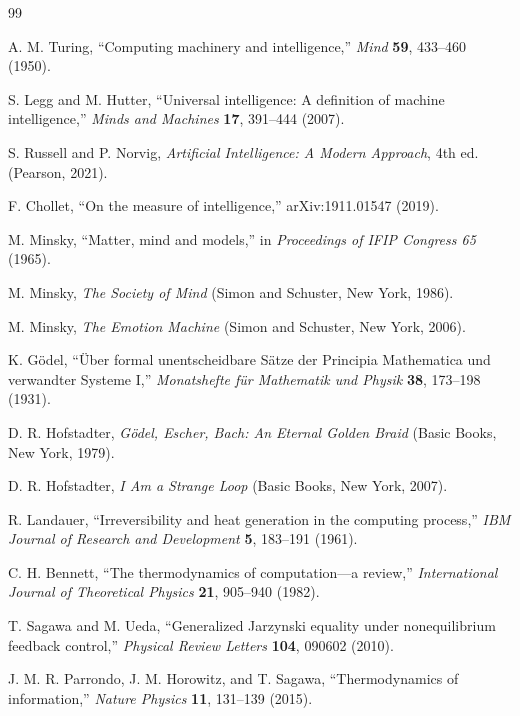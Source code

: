 \documentclass[
  aps,
  prresearch,
  reprint,
  amsmath,
  amssymb,
  superscriptaddress,
  nofootinbib,
  longbibliography
]{revtex4-2}
\begin{document}
\begin{thebibliography}{99}

A. M. Turing, ``Computing machinery and intelligence,'' \emph{Mind} \textbf{59}, 433--460 (1950).

S. Legg and M. Hutter, ``Universal intelligence: A definition of machine intelligence,'' \emph{Minds and Machines} \textbf{17}, 391--444 (2007).

S. Russell and P. Norvig, \emph{Artificial Intelligence: A Modern Approach}, 4th ed. (Pearson, 2021).

F. Chollet, ``On the measure of intelligence,'' arXiv:1911.01547 (2019).

M. Minsky, ``Matter, mind and models,'' in \emph{Proceedings of IFIP Congress 65} (1965).

M. Minsky, \emph{The Society of Mind} (Simon and Schuster, New York, 1986).

M. Minsky, \emph{The Emotion Machine} (Simon and Schuster, New York, 2006).

K. G{\"o}del, ``{\"U}ber formal unentscheidbare S{\"a}tze der Principia Mathematica und verwandter Systeme I,'' \emph{Monatshefte f{\"u}r Mathematik und Physik} \textbf{38}, 173--198 (1931).

D. R. Hofstadter, \emph{G{\"o}del, Escher, Bach: An Eternal Golden Braid} (Basic Books, New York, 1979).

D. R. Hofstadter, \emph{I Am a Strange Loop} (Basic Books, New York, 2007).

R. Landauer, ``Irreversibility and heat generation in the computing process,'' \emph{IBM Journal of Research and Development} \textbf{5}, 183--191 (1961).

C. H. Bennett, ``The thermodynamics of computation---a review,'' \emph{International Journal of Theoretical Physics} \textbf{21}, 905--940 (1982).

T. Sagawa and M. Ueda, ``Generalized Jarzynski equality under nonequilibrium feedback control,'' \emph{Physical Review Letters} \textbf{104}, 090602 (2010).

J. M. R. Parrondo, J. M. Horowitz, and T. Sagawa, ``Thermodynamics of information,'' \emph{Nature Physics} \textbf{11}, 131--139 (2015).


\end{thebibliography}
\end{document}
